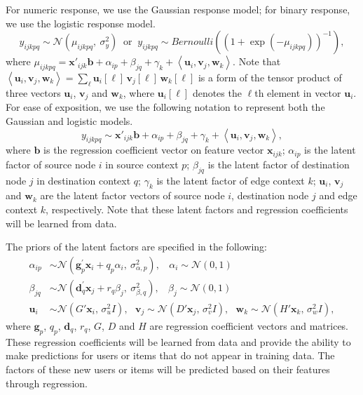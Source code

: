 \documentclass[10pt]{article}
\newcommand{\parahead}[1]{\vspace{0.15in}\noindent{\bf #1:}}
\begin{document}
\parahead{Response model}
For numeric response, we use the Gaussian response model; for binary response, we use the logistic response model.
\begin{equation*}
y_{ijkpq} \sim \mathcal{N}(\mu_{ijkpq},~ \sigma^2_{y}) ~\textrm{ or }~
y_{ijkpq} \sim \textit{Bernoulli}((1 + \exp(-\mu_{ijkpq}))^{-1}),
\end{equation*}
where $\mu_{ijkpq} = \bm{x}'_{ijk} \bm{b} + \alpha_{ip} + \beta_{jq} + \gamma_{k} + \left<\bm{u}_i, \bm{v}_j, \bm{w}_k\right>$.  Note that $\left<\bm{u}_i, \bm{v}_j, \bm{w}_k\right> = \sum_{\ell} \bm{u}_i[\ell]\, \bm{v}_j[\ell]\, \bm{w}_k[\ell]$ is a form of the tensor product of three vectors $\bm{u}_i$, $\bm{v}_j$ and $\bm{w}_k$, where $\bm{u}_i[\ell]$ denotes the $\ell$th element in vector $\bm{u}_i$.
For ease of exposition, we use the following notation to represent both the Gaussian and logistic models.
\begin{equation}
y_{ijkpq} \sim \bm{x}'_{ijk} \bm{b} + \alpha_{ip} + \beta_{jq} + \gamma_{k} + \left<\bm{u}_i, \bm{v}_j, \bm{w}_k\right>, \label{eq:uvw-model}
\end{equation}
where $\bm{b}$ is the regression coefficient vector on feature vector $\bm{x}_{ijk}$; $\alpha_{ip}$ is the latent factor of source node $i$ in source context $p$; $\beta_{jq}$ is the latent factor of destination node $j$ in destination context $q$; $\gamma_{k}$ is the latent factor of edge context $k$; $\bm{u}_i$, $\bm{v}_j$ and $\bm{w}_k$ are the latent factor vectors of source node $i$, destination node $j$ and edge context $k$, respectively.  Note that these latent factors and regression coefficients will be learned from data.

\parahead{Regression Priors}
The priors of the latent factors are specified in the following:
\begin{align}
\alpha_{ip} & \sim \mathcal{N}(\bm{g}_{p}^\prime \bm{x}_{i} + q_{p} \alpha_i, ~\sigma_{\alpha,p}^2),
	~~~~ \alpha_i \sim \mathcal{N}(0, 1) \label{eq:alpha} \\
\beta_{jq} & \sim \mathcal{N}(\bm{d}_{q}^\prime \bm{x}_{j} + r_{q} \beta_j, ~\sigma_{\beta,q}^2),
	~~~~ \beta_j  \sim \mathcal{N}(0, 1) \label{eq:beta} \\
\bm{u}_{i} & \sim \mathcal{N}(G' \bm{x}_i, \,\sigma_{u}^2 I), ~~~
\bm{v}_{j} \sim \mathcal{N}(D' \bm{x}_j, \,\sigma_{v}^2 I), ~~~
\bm{w}_{k} \sim \mathcal{N}(H' \bm{x}_k, \,\sigma_{w}^2 I), \label{eq:uvw}
\end{align}
where $\bm{g}_p$, $q_p$, $\bm{d}_q$, $r_q$, $G$, $D$ and $H$ are regression coefficient vectors and matrices.  These regression coefficients will be learned from data and provide the ability to make predictions for users or items that do not appear in training data.  The factors of these new users or items will be predicted based on their features through regression.
\end{document}
